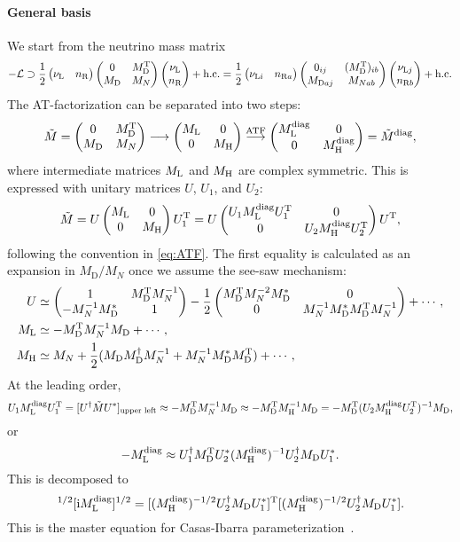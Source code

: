\documentclass[CheatSheet]{subfiles}
\newcommand\MD[1][]{M_{\mathrm{D}#1}}
\newcommand\MN[1][]{M_{N#1}}
\begin{document}
\paragraph{General basis}
We start from the neutrino mass matrix
\begin{equation}
-\mathcal L\supset \frac12
 \pmat{\nuL & \nR} \pmat{0 & \MD^\TT \\ \MD & \MN} \pmat{\nuL \\ \nR}+\text{h.c.}
= \frac12\pmat{\nuL[i] & \nR[a]}
\pmat{0_{ij} & (\MD^\TT)_{ib} \\ \MD[aj] & \MN[ab]}
\pmat{\nuL[j] \\ \nR[b]}+\text{h.c.}
\end{equation}
The AT-factorization can be separated into two steps:
\begin{equation}
 \tilde M=\pmat{0 & \MD^\TT \\ \MD & \MN}
\longrightarrow
\pmat{M\w L & 0 \\ 0 & M\w H}
\stackrel{\text{ATF}}\longrightarrow
\pmat{M\w L\wdiag & 0 \\ 0 & M\w H\wdiag}=\tilde M\wdiag,
\end{equation}
where intermediate matrices $M_{\mathrm{L}}$ and $M_{\mathrm{H}}$ are complex symmetric.
This is expressed with unitary matrices $U$, $U_1$, and $U_2$:
\begin{equation}
 \tilde M =
U \begin{pmatrix}M_{\mathrm{L}} & 0 \\ 0 & M_{\mathrm{H}}\end{pmatrix} U_1^{\mathrm{T}} =
U \begin{pmatrix}U_1 M_{\mathrm{L}}^{\text{diag}} U_1^{\mathrm{T}} & 0 \\ 0 & U_2 M_{\mathrm{H}}^{\text{diag}} U_2^{\mathrm{T}}\end{pmatrix} U^{\mathrm{T}},
\end{equation}
following the convention in \cref{eq:ATF}.
The first equality is calculated as an expansion in $\MD/\MN$ once we assume the see-saw mechanism:
\begin{align}
 U&\simeq \pmat{1 & \MD^\TT\MN^{-1} \\ -\MN^{-1}\MD^* & 1}
 - \frac12\pmat{\MD^\TT\MN^{-2}\MD^* & 0 \\ 0 & \MN^{-1}\MD^*\MD^\TT \MN^{-1}} + \cdots,\\
 M\w L&\simeq -\MD^\TT \MN^{-1} \MD+\cdots,\\
 M\w H&\simeq \MN + \frac12 (\MD\MD^\dagger\MN^{-1}+\MN^{-1}\MD^*\MD^\TT)+\cdots,
\end{align}
At the leading order,
\begin{equation*}
 U_1 M\w L\wdiag U_1^\TT = [U^\dagger \tilde M U^*]_{\text{upper left}} \approx -\MD^\TT \MN^{-1}\MD
\approx -\MD^\TT M\w H^{-1}\MD = -\MD^\TT (U_2 M\w H\wdiag U_2^\TT)^{-1}\MD,
\end{equation*}
or
\begin{equation*}
 -M\w L\wdiag \approx U_1^\dagger \MD^\TT U_2^*(M\w H\wdiag)^{-1}U_2^\dagger\MD U_1^*.
\end{equation*}
This is decomposed to
\begin{equation}
 [\ii M\w L\wdiag]^{1/2}[\ii M\w L\wdiag]^{1/2} = 
[(M\w H\wdiag)^{-1/2}U_2^\dagger\MD U_1^*]^\TT
[(M\w H\wdiag)^{-1/2}U_2^\dagger\MD U_1^*].
\end{equation}
This is the master equation for Casas-Ibarra parameterization~\cite{Casas:2001sr}.
\end{document}
